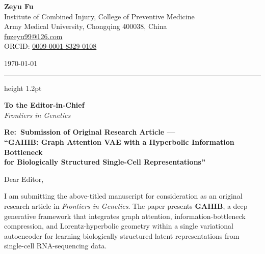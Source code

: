 \documentclass[11pt,a4paper]{article}
\newcommand{\journalFull}{Frontiers in Genetics}
\begin{document}
\thispagestyle{fancy}

\noindent
\begin{minipage}[t]{0.62\linewidth}
  {\Large\bfseries\color{accentblue} Zeyu Fu}\\[3pt]
  {\small\color{darkgray}
    Institute of Combined Injury, College of Preventive Medicine\\
    Army Medical University, Chongqing 400038, China\\
    \href{mailto:fuzeyu99@126.com}{fuzeyu99@126.com}\\
    ORCID: \href{https://orcid.org/0009-0001-8329-0108}{0009-0001-8329-0108}}
\end{minipage}%
\hfill
\begin{minipage}[t]{0.34\linewidth}
  \raggedleft
  {\small\color{darkgray}\today}
\end{minipage}

\vspace{4pt}
{\color{ruleblue}\hrule height 1.2pt}
\vspace{8pt}

\noindent
{\small\color{darkgray}%
\textbf{To the Editor-in-Chief}\\
\textit{\journalFull}}

\vspace{6pt}

\noindent\textbf{\large\color{accentblue}%
  Re:\ Submission of Original Research Article ---\\[2pt]
  ``GAHIB: Graph Attention VAE with a Hyperbolic Information
  Bottleneck\\
  for Biologically Structured Single-Cell Representations''}

\vspace{8pt}

\noindent Dear Editor,

\vspace{2pt}

I am submitting the above-titled manuscript for consideration as
an original research article in \textit{\journalFull}.
The paper presents \textbf{GAHIB}, a deep generative framework that
integrates graph attention, information-bottleneck compression, and
Lorentz-hyperbolic geometry within a single variational autoencoder
for learning biologically structured latent representations from
single-cell RNA-sequencing data.
\end{document}
